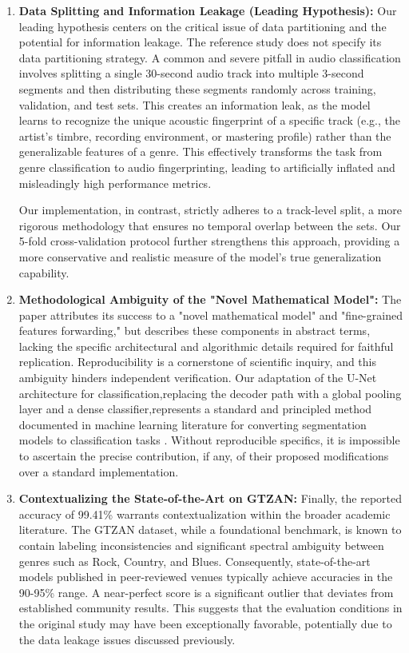 \documentclass[11pt,a4paper]{article}
\begin{document}
\begin{enumerate}
    \item \textbf{Data Splitting and Information Leakage (Leading Hypothesis):} Our leading hypothesis centers on the critical issue of data partitioning and the potential for information leakage. The reference study does not specify its data partitioning strategy. A common and severe pitfall in audio classification involves splitting a single 30-second audio track into multiple 3-second segments and then distributing these segments randomly across training, validation, and test sets. This creates an information leak, as the model learns to recognize the unique acoustic fingerprint of a specific track (e.g., the artist's timbre, recording environment, or mastering profile) rather than the generalizable features of a genre.
    This effectively transforms the task from genre classification to audio fingerprinting, leading to artificially inflated and misleadingly high performance metrics.

    Our implementation, in contrast, strictly adheres to a track-level split, a more rigorous methodology that ensures no temporal overlap between the sets. Our 5-fold cross-validation protocol further strengthens this approach, providing a more conservative and realistic measure of the model's true generalization capability.

    \item \textbf{Methodological Ambiguity of the "Novel Mathematical Model":} The paper attributes its success to a "novel mathematical model" and "fine-grained features forwarding," but describes these components in abstract terms, lacking the specific architectural and algorithmic details required for faithful replication. Reproducibility is a cornerstone of scientific inquiry, and this ambiguity hinders independent verification. Our adaptation of the U-Net architecture for classification,replacing the decoder path with a global pooling layer and a dense classifier,represents a standard and principled method documented in machine learning literature for converting segmentation models to classification tasks \textbf{\cite{ronneberger2015unet}}. %
    Without reproducible specifics, it is impossible to ascertain the precise contribution, if any, of their proposed modifications over a standard implementation.

    \item \textbf{Contextualizing the State-of-the-Art on GTZAN:} Finally, the reported accuracy of 99.41\% warrants contextualization within the broader academic literature. The GTZAN dataset, while a foundational benchmark, is known to contain labeling inconsistencies and significant spectral ambiguity between genres such as Rock, Country, and Blues. Consequently, state-of-the-art models published in peer-reviewed venues typically achieve accuracies in the 90-95\% range.
    A near-perfect score is a significant outlier that deviates from established community results. This suggests that the evaluation conditions in the original study may have been exceptionally favorable, potentially due to the data leakage issues discussed previously.
\end{enumerate}
\end{document}
